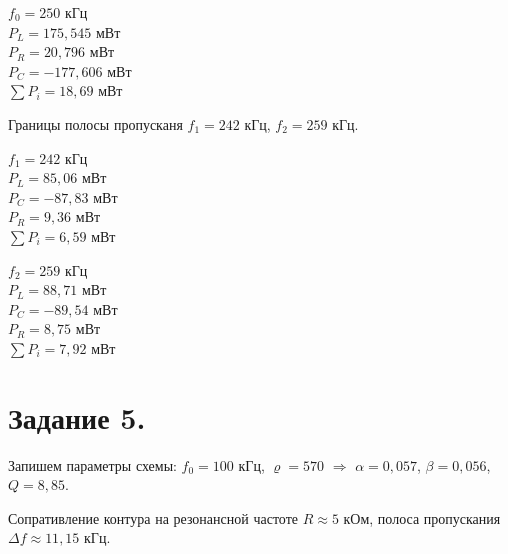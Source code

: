 	\begin{center}
		$f_0 = 250$      кГц   \\
		$P_L = 175,545$  мВт   \\
		$P_R = 20,796$   мВт   \\
		$P_C = -177,606$ мВт   \\
		$\sum P_i = 18,69$ мВт \\
	\end{center}

	\noindent Границы полосы пропусканя $f_1 = 242$ кГц, $f_2 = 259$ кГц.

	\begin{center}
		$f_1 = 242$      кГц   \\
		$P_L = 85,06$  мВт   \\
		$P_C = -87,83$   мВт   \\
		$P_R = 9,36$ мВт   \\
		$\sum P_i = 6,59$ мВт \\
	\end{center}

	\begin{center}
		$f_2 = 259$      кГц   \\
		$P_L = 88,71$  мВт   \\
		$P_C = -89,54$   мВт   \\
		$P_R = 8,75$ мВт   \\
		$\sum P_i = 7,92$ мВт \\
	\end{center}


	\section{Задание 5.}

	Запишем параметры схемы: $f_0 = 100$ кГц, $\varrho = 570$ $\Rightarrow$ $\alpha = 0,057$, $\beta = 0,056$, $Q = 8,85$.


	\noindent Сопративление контура на резонансной частоте $R \approx 5$ кОм, полоса пропускания $\Delta f \approx 11,15$ кГц.


